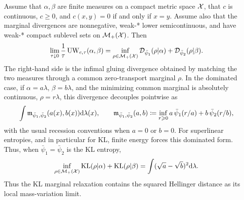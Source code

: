 \begin{prop}\label{prop-unbalanced-small-scale-limit}
	Assume that $\alpha,\beta$ are finite measures on a compact metric space $\mathcal{X}$, that $c$ is continuous, $c\geq0$, and $c(x,y)=0$ if and only if $x=y$. Assume also that the marginal divergences are nonnegative, weak-* lower semicontinuous, and have weak-* compact sublevel sets on $\mathcal{M}_+(\mathcal{X})$. Then
	\[
		\lim_{\tau\downarrow0}\frac1\tau\operatorname{UW}_{c,\tau}(\alpha,\beta)
		=
		\inf_{\rho\in\mathcal{M}_+(\mathcal{X})}
		\mathcal{D}_{\bar\psi_1}(\rho|\alpha)
		+
		\mathcal{D}_{\bar\psi_2}(\rho|\beta).
	\]
	The right-hand side is the infimal gluing divergence obtained by matching the two measures through a common zero-transport marginal $\rho$. In the dominated case, if $\alpha=a\lambda$, $\beta=b\lambda$, and the minimizing common marginal is absolutely continuous, $\rho=r\lambda$, this divergence decouples pointwise as
	\[
		\int \mathfrak m_{\bar\psi_1,\bar\psi_2}(a(x),b(x))\mathrm{d}\lambda(x),
		\qquad
		\mathfrak m_{\bar\psi_1,\bar\psi_2}(a,b)
		\coloneqq
		\inf_{r\geqslant0} a\,\bar\psi_1(r/a)+b\,\bar\psi_2(r/b),
	\]
	with the usual recession conventions when $a=0$ or $b=0$. For superlinear entropies, and in particular for KL, finite energy forces this dominated form. Thus, when $\bar\psi_1=\bar\psi_2$ is the KL entropy,
	\[
		\inf_{\rho\in\mathcal{M}_+(\mathcal{X})} \operatorname{KL}(\rho|\alpha)+\operatorname{KL}(\rho|\beta)
		=
		\int (\sqrt{a}-\sqrt{b})^2\mathrm{d}\lambda .
	\]
	Thus the KL marginal relaxation contains the squared Hellinger distance as its local mass-variation limit.
\end{prop}

